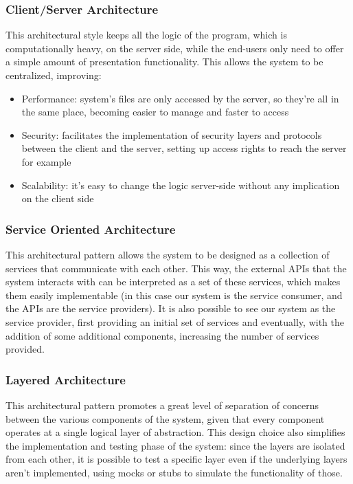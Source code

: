 \documentclass[12pt]{article}
\begin{document}
\subsubsection{Client/Server Architecture} This architectural style keeps all the logic of the program, which is computationally heavy, on the server side, while the end-users only need to offer a simple amount of presentation functionality. This allows the system to be centralized, improving:
\begin{itemize}
    \item Performance: system's files are only accessed by the server, so they're all in the same place, becoming easier to manage and faster to access
    \item Security: facilitates the implementation of security layers and protocols between the client and the server, setting up access rights to reach the server for example
    \item Scalability: it's easy to change the logic server-side without any implication on the client side
\end{itemize}

\subsubsection{Service Oriented Architecture} This architectural pattern allows the system to be designed as a collection of services that communicate with each other. This way, the external APIs that the system interacts with can be interpreted as a set of these services, which makes them easily implementable (in this case our system is the service consumer, and the APIs are the service providers). It is also possible to see our system as the service provider, first providing an initial set of services and eventually, with the addition of some additional components, increasing the number of services provided.

\subsubsection{Layered Architecture} This architectural pattern promotes a great level of separation of concerns between the various components of the system, given that every component operates at a single logical layer of abstraction. This design choice also simplifies the implementation and testing phase of the system: since the layers are isolated from each other, it is possible to test a specific layer even if the underlying layers aren't implemented, using mocks or stubs to simulate the functionality of those.
\end{document}
